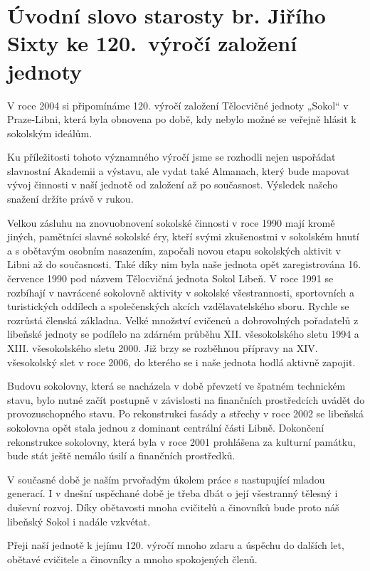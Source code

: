 \documentclass[a5paper, 11pt, twoside]{article}
\begin{document}
\section{Úvodní slovo starosty br. Jiřího Sixty ke 120.~výročí založení jednoty}

V roce 2004 si připomínáme 120. výročí založení Tělocvičné jednoty
„Sokol`` v Praze-Libni, která byla obnovena po době, kdy nebylo možné se
veřejně hlásit k sokolským ideálům.

Ku příležitosti tohoto významného výročí jsme se rozhodli nejen
uspořádat slavnostní Akademii a výstavu, ale vydat také Almanach, který
bude mapovat vývoj činnosti v naší jednotě od založení až po současnost.
Výsledek našeho snažení držíte právě v rukou.

Velkou zásluhu na znovuobnovení sokolské činnosti v roce 1990 mají kromě
jiných, pamětníci slavné sokolské éry, kteří svými zkušenostmi v
sokolském hnutí a s obětavým osobním nasazením, započali novou etapu
sokolských aktivit v Libni až do současnosti. Také díky nim byla naše
jednota opět zaregistrována 16. července 1990 pod názvem Tělocvičná
jednota Sokol Libeň. V roce 1991 se rozbíhají v navrácené sokolovně
aktivity v sokolské všestrannosti, sportovních a turistických oddílech a
společenských akcích vzdělavatelského sboru. Rychle se rozrůstá členská
základna. Velké množství cvičenců a dobrovolných pořadatelů z libeňské
jednoty se podílelo na zdárném průběhu XII. všesokolského sletu 1994 a
XIII. všesokolského sletu 2000. Již brzy se rozběhnou přípravy na XIV.
všesokolský slet v roce 2006, do kterého se i naše jednota hodlá aktivně
zapojit.

Budovu sokolovny, která se nacházela v době převzetí ve špatném
technickém stavu, bylo nutné začít postupně v závislosti na finančních
prostředcích uvádět do provozuschopného stavu. Po rekonstrukci fasády a
střechy v roce 2002 se libeňská sokolovna opět stala jednou z dominant
centrální části Libně. Dokončení rekonstrukce sokolovny, která byla v
roce 2001 prohlášena za kulturní památku, bude stát ještě nemálo úsilí a
finančních prostředků.

V současné době je naším prvořadým úkolem práce s nastupující mladou
generací. I v dnešní uspěchané době je třeba dbát o její všestranný
tělesný i duševní rozvoj. Díky obětavosti mnoha cvičitelů a činovníků
bude proto náš libeňský Sokol i nadále vzkvétat.

Přeji naší jednotě k jejímu 120. výročí mnoho zdaru a úspěchu do dalších
let, obětavé cvičitele a činovníky a mnoho spokojených členů.
\end{document}
